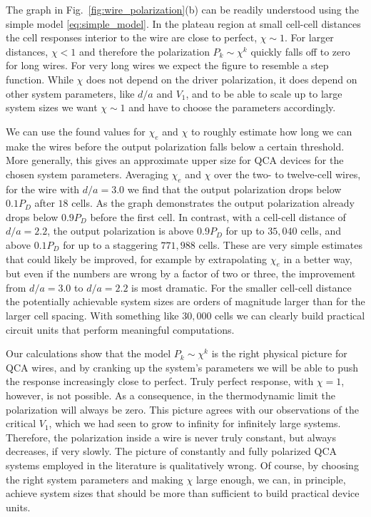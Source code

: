 The graph in Fig.~\ref{fig:wire_polarization}(b) can be readily understood using
the simple model \eqref{eq:simple_model}. In the plateau region at small
cell-cell distances the cell responses interior to the wire are close to
perfect, $\chi \sim 1$. For larger distances, $\chi < 1$ and therefore the
polarization $P_k \sim \chi^k$ quickly falls off to zero for long wires. For
very long wires we expect the figure to resemble a step function. While $\chi$
does not depend on the driver polarization, it does depend on other system
parameters, like $d/a$ and $V_1$, and to be able to scale up to large system
sizes we want $\chi \sim 1$ and have to choose the parameters accordingly.

We can use the found values for $\chi_e$ and $\chi$ to roughly estimate how long
we can make the wires before the output polarization falls below a certain
threshold. More generally, this gives an approximate upper size for QCA devices
for the chosen system parameters. Averaging $\chi_e$ and $\chi$ over the two- to
twelve-cell wires, for the wire with $d/a = 3.0$ we find that the output
polarization drops below $0.1 P_D$ after $18$ cells. As the graph demonstrates the
output polarization already drops below $0.9 P_D$ before the first cell. In
contrast, with a cell-cell distance of $d/a = 2.2$, the output polarization is
above $0.9 P_D$ for up to $35,040$ cells, and above $0.1 P_D$ for up to a
staggering $771,988$ cells. These are very simple estimates that could likely be
improved, for example by extrapolating $\chi_e$ in a better way, but even if the
numbers are wrong by a factor of two or three, the improvement from $d/a = 3.0$
to $d/a = 2.2$ is most dramatic. For the smaller cell-cell distance the
potentially achievable system sizes are orders of magnitude larger than for the
larger cell spacing. With something like $30,000$ cells we can clearly build
practical circuit units that perform meaningful computations.

Our calculations show that the model $P_k \sim \chi^k$ is the right physical
picture for QCA wires, and by cranking up the system's parameters
we will be able to push the response increasingly close to perfect. Truly
perfect response, with $\chi = 1$, however, is not possible. As a consequence, in the
thermodynamic limit the polarization will always be zero. This picture agrees
with our observations of the critical $V_1$, which we had seen to grow to
infinity for infinitely large systems. Therefore, the polarization inside a wire
is never truly constant, but always decreases, if very slowly. The picture of
constantly and fully polarized QCA systems employed in the literature is
qualitatively wrong. Of course, by choosing the right system parameters and
making $\chi$ large enough, we can, in principle, achieve system sizes that
should be more than sufficient to build practical device units. 

